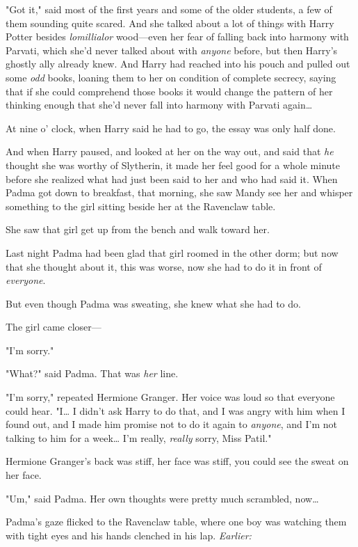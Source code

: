 "Got it," said most of the first years and some of the older students, a few of 
them sounding quite scared.
\sbreak
And she talked about a lot of things with Harry Potter besides 
\emph{lomillialor} wood---even her fear of falling back into harmony with 
Parvati, which she'd never talked about with \emph{anyone} before, but then 
Harry's ghostly ally already knew. And Harry had reached into his pouch and 
pulled out some \emph{odd} books, loaning them to her on condition of complete 
secrecy, saying that if she could comprehend those books it would change the 
pattern of her thinking enough that she'd never fall into harmony with Parvati 
again{\ldots}

At nine o' clock, when Harry said he had to go, the essay was only half done.

And when Harry paused, and looked at her on the way out, and said that 
\emph{he} thought she was worthy of Slytherin, it made her feel good for a 
whole minute before she realized what had just been said to her and who had 
said it.
\sbreak
When Padma got down to breakfast, that morning, she saw Mandy see her and 
whisper something to the girl sitting beside her at the Ravenclaw table.

She saw that girl get up from the bench and walk toward her.

Last night Padma had been glad that girl roomed in the other dorm; but now that 
she thought about it, this was worse, now she had to do it in front of 
\emph{everyone}.

But even though Padma was sweating, she knew what she had to do.

The girl came closer---

"I'm sorry."

"What?" said Padma. That was \emph{her} line.

"I'm sorry," repeated Hermione Granger. Her voice was loud so that everyone 
could hear. "I{\ldots} I didn't ask Harry to do that, and I was angry with him 
when I found out, and I made him promise not to do it again to \emph{anyone}, 
and I'm not talking to him for a week{\ldots} I'm really, \emph{really} sorry, 
Miss Patil."

Hermione Granger's back was stiff, her face was stiff, you could see the sweat 
on her face.

"Um," said Padma. Her own thoughts were pretty much scrambled, now{\ldots}

Padma's gaze flicked to the Ravenclaw table, where one boy was watching them 
with tight eyes and his hands clenched in his lap.
\sbreak
\emph{Earlier:}

